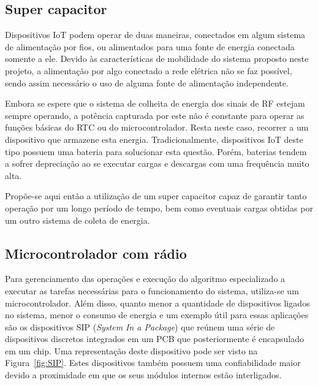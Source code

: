 \subsection{Super capacitor}
Dispositivos IoT podem operar de duas maneiras, conectados em algum sistema de alimentação por fios, ou alimentados para uma fonte de energia conectada somente a ele. Devido às características de mobilidade do sistema proposto neste projeto, a alimentação por algo conectado a rede elétrica não se faz possível, sendo assim necessário o uso de alguma fonte de alimentação independente.

Embora se espere que o sistema de colheita de energia dos sinais de RF estejam sempre operando, a potência capturada por este não é constante para operar as funções básicas do RTC ou do microcontrolador.
Resta neste caso, recorrer a um dispositivo que armazene esta energia. Tradicionalmente, dispositivos IoT deste tipo possuem uma bateria para solucionar esta questão. Porém, baterias tendem a sofrer depreciação ao se executar cargas e descargas com uma frequência muito alta. 

Propõe-se aqui então a utilização de um super capacitor capaz de garantir tanto operação por um longo período de tempo, bem como eventuais cargas obtidas por um outro sistema de coleta de energia.

\subsection{Microcontrolador com rádio}
Para gerenciamento das operações e execução do algoritmo especializado a executar as tarefas necessárias para o funcionamento do sistema, utiliza-se um microcontrolador. Além disso, quanto menor a quantidade de dispositivos ligados no sistema, menor o consumo de energia e um exemplo útil para essas aplicações são os dispositivos SIP (\textit{System In a Package}) que reúnem uma série de dispositivos discretos integrados em um PCB que posteriormente é encapsulado em um chip. Uma representação deste dispositivo pode ser visto na Figura~\ref{fig:SIP}. Estes dispositivos também possuem uma confiabilidade maior devido a proximidade em que os seus módulos internos estão interligados.

